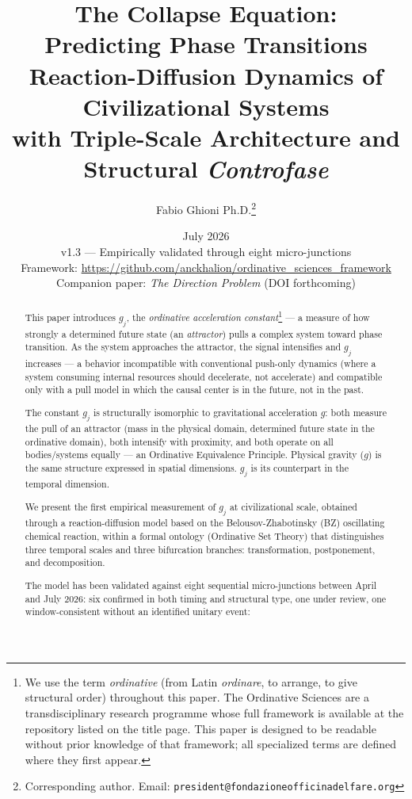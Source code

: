 \documentclass[12pt,a4paper]{article}
\title{\textbf{The Collapse Equation:\\Predicting Phase Transitions}\\[1em]\large Reaction-Diffusion Dynamics of Civilizational Systems\\with Triple-Scale Architecture and Structural \textit{Controfase}}
\author[1]{Fabio Ghioni Ph.D.\thanks{Corresponding author. Email: \texttt{president@fondazioneofficinadelfare.org}}}
\affil[1]{Ordinative Sciences Foundation Research Labs\\\small\url{https://ordinativescience.foundation}}
\date{July 2026\\[0.5em]\small v1.3 --- Empirically validated through eight micro-junctions\\[0.3em]\small Framework: \url{https://github.com/anckhalion/ordinative_sciences_framework}\\[0.3em]\small Companion paper: \emph{The Direction Problem} (DOI forthcoming)}
\newcommand{\gj}{g_j}
\begin{document}
\maketitle

\begin{abstract}
This paper introduces $\gj$, the \emph{ordinative acceleration constant}\footnote{We use the term \emph{ordinative} (from Latin \emph{ordinare}, to arrange, to give structural order) throughout this paper. The Ordinative Sciences are a transdisciplinary research programme whose full framework is available at the repository listed on the title page. This paper is designed to be readable without prior knowledge of that framework; all specialized terms are defined where they first appear.} --- a measure of how strongly a determined future state (an \emph{attractor}) pulls a complex system toward phase transition. As the system approaches the attractor, the signal intensifies and $\gj$ increases --- a behavior incompatible with conventional push-only dynamics (where a system consuming internal resources should decelerate, not accelerate) and compatible only with a pull model in which the causal center is in the future, not in the past.

The constant $\gj$ is structurally isomorphic to gravitational acceleration $g$: both measure the pull of an attractor (mass in the physical domain, determined future state in the ordinative domain), both intensify with proximity, and both operate on all bodies/systems equally --- an Ordinative Equivalence Principle. Physical gravity ($g$) is the same structure expressed in spatial dimensions. $\gj$ is its counterpart in the temporal dimension.

We present the first empirical measurement of $\gj$ at civilizational scale, obtained through a reaction-diffusion model based on the Belousov-Zhabotinsky (BZ) oscillating chemical reaction, within a formal ontology (Ordinative Set Theory) that distinguishes three temporal scales and three bifurcation branches: transformation, postponement, and decomposition.

The model has been validated against eight sequential micro-junctions between April and July 2026: six confirmed in both timing and structural type, one under review, one window-consistent without an identified unitary event:


\end{abstract}
\end{document}
